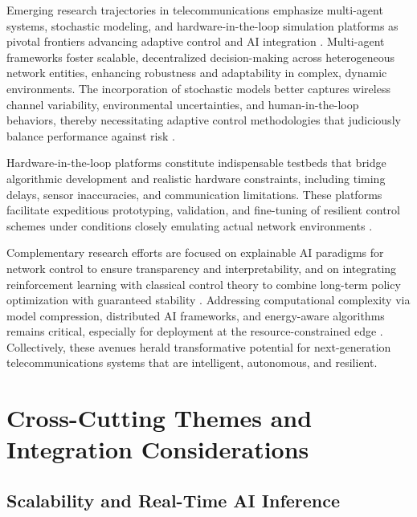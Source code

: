 Emerging research trajectories in telecommunications emphasize multi-agent systems, stochastic modeling, and hardware-in-the-loop simulation platforms as pivotal frontiers advancing adaptive control and AI integration \cite{ref46}. Multi-agent frameworks foster scalable, decentralized decision-making across heterogeneous network entities, enhancing robustness and adaptability in complex, dynamic environments. The incorporation of stochastic models better captures wireless channel variability, environmental uncertainties, and human-in-the-loop behaviors, thereby necessitating adaptive control methodologies that judiciously balance performance against risk \cite{ref46}.

Hardware-in-the-loop platforms constitute indispensable testbeds that bridge algorithmic development and realistic hardware constraints, including timing delays, sensor inaccuracies, and communication limitations. These platforms facilitate expeditious prototyping, validation, and fine-tuning of resilient control schemes under conditions closely emulating actual network environments \cite{ref46}.

Complementary research efforts are focused on explainable AI paradigms for network control to ensure transparency and interpretability, and on integrating reinforcement learning with classical control theory to combine long-term policy optimization with guaranteed stability \cite{ref50}. Addressing computational complexity via model compression, distributed AI frameworks, and energy-aware algorithms remains critical, especially for deployment at the resource-constrained edge \cite{ref49}. Collectively, these avenues herald transformative potential for next-generation telecommunications systems that are intelligent, autonomous, and resilient.

\section{Cross-Cutting Themes and Integration Considerations}

\subsection{Scalability and Real-Time AI Inference}

